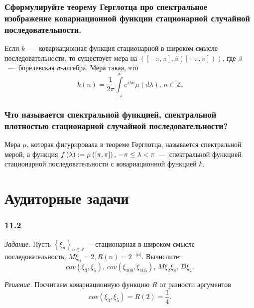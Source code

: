 \subsubsection*{Сформулируйте теорему Герглотца про спектральное изображение ковариационной функции
                стационарной случайной последовательности.}

Если $k$~---~ковариационная функция стационарной в широком смысле последовательности,
то существует мера на
$ \left( \left[ -\pi, \pi \right], \beta \left( \left[ -\pi, \pi \right] \right) \right) $,
где $ \beta $~---~борелевская $ \sigma$-алгебра.
Мера такая, что
\begin{equation*}
  k \left( n \right) =
  \frac{1}{2 \pi } \int \limits_{-\pi }^{ \pi } e^{i \lambda n} \mu \left( d \lambda \right), \,
  n \in \mathbb{Z}.
\end{equation*}

\subsubsection*{Что называется спектральной функцией, спектральной плотностью стационарной случайной
                последовательности?}

Мера $ \mu $, которая фигурировала в теореме Герглотца, называется спектральной мерой, а функция
$f \left( \lambda \right) := \mu \left( \left[ \-\pi, \pi \right] \right), \,
  -\pi \leq \lambda < \pi $~---~спектральной
функцией стационарной последовательности с ковариационной функцией $k$.

\section*{Аудиторные задачи}

\subsubsection*{11.2}

\textit{Задание.}
Пусть $ \left\{ \xi_n \right\}_{n \in \mathbb{Z}}$~---стационарная
в широком смысле последовательность, $M \xi_n = 2, R \left( n \right) = 2^{-\left| n \right| }$.
Вычислите:
\begin{equation*}
  cov \left( \xi_3, \xi_5 \right), \,
  cov \left( \xi_{100}, \xi_{105} \right), \,
  M \xi_2 \xi_8, \,
  D \xi_4.
\end{equation*}

\textit{Решение.}
Посчитаем ковариационную функцию $R$ от разности аргументов
\begin{equation*}
  cov \left( \xi_3, \xi_5 \right) =
  R \left( 2 \right) =
  \frac{1}{4}.
\end{equation*}

